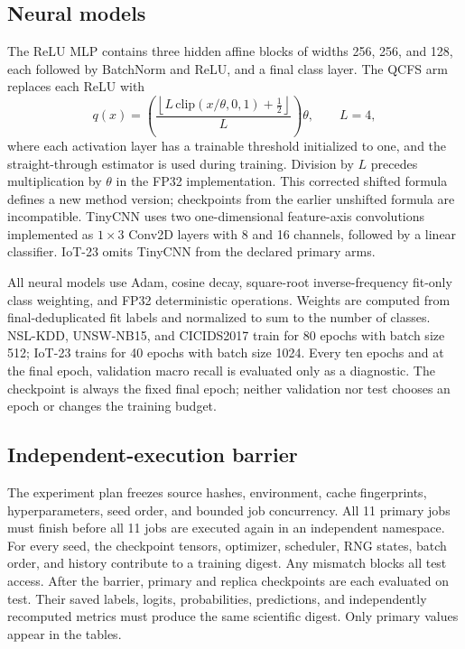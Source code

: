 \documentclass[10pt,conference]{IEEEtran}
\begin{document}
\subsection{Neural models}

The ReLU MLP contains three hidden affine blocks of widths 256, 256, and 128,
each followed by BatchNorm and ReLU, and a final class layer. The QCFS arm
replaces each ReLU with
\begin{equation}
 q(x)=\left(\frac{\left\lfloor L\,\mathrm{clip}(x/\theta,0,1)+\tfrac{1}{2}\right\rfloor}{L}\right)\theta,
 \qquad L=4,
\end{equation}
where each activation layer has a trainable threshold initialized to one,
and the straight-through estimator is used during training. Division by $L$
precedes multiplication by $\theta$ in the FP32 implementation. This corrected
shifted formula defines a new method version; checkpoints from the earlier
unshifted formula are incompatible. TinyCNN uses two one-dimensional
feature-axis convolutions implemented as $1\times3$ Conv2D layers with 8 and
16 channels, followed by a linear classifier. IoT-23 omits TinyCNN from the
declared primary arms.

All neural models use Adam, cosine decay, square-root inverse-frequency
fit-only class weighting, and FP32 deterministic operations. Weights are
computed from final-deduplicated fit labels and normalized to sum to the number
of classes. NSL-KDD, UNSW-NB15, and CICIDS2017 train
for 80 epochs with batch size 512; IoT-23 trains for 40 epochs with batch size
1024. Every ten epochs and at the final epoch, validation macro recall is
evaluated only as a diagnostic. The checkpoint is always the fixed final
epoch; neither validation nor test chooses an epoch or changes the training
budget.

\subsection{Independent-execution barrier}

The experiment plan freezes source hashes, environment, cache fingerprints,
hyperparameters, seed order, and bounded job concurrency. All 11 primary jobs
must finish before all 11 jobs are executed again in an independent namespace.
For every seed, the checkpoint tensors, optimizer, scheduler, RNG states,
batch order, and history contribute to a training digest. Any mismatch blocks
all test access. After the barrier, primary and replica checkpoints are each
evaluated on test. Their saved labels, logits, probabilities, predictions,
and independently recomputed metrics must produce the same scientific digest.
Only primary values appear in the tables.
\end{document}
